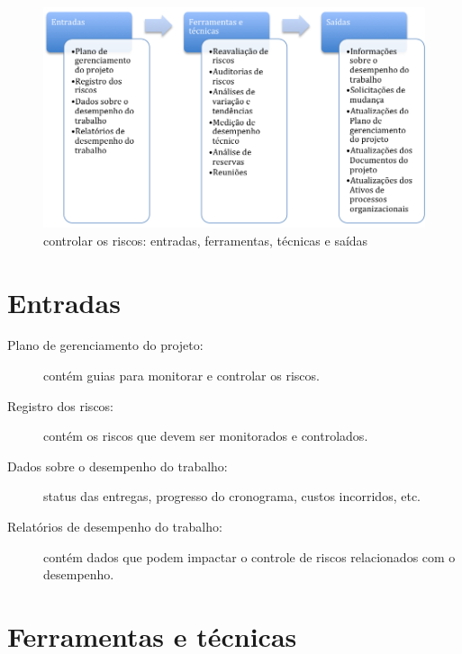 \begin{figure}[!h]
	\centering
	\includegraphics[scale=0.5]{Figuras/riscos_efts_controlar.png}
	\caption{controlar os riscos: entradas, ferramentas, técnicas e saídas}
	\label{fig:riscos:controlar:efts}
\end{figure}

\section{Entradas}

\begin{description}
	
	\item[Plano de gerenciamento do projeto:] contém guias para monitorar e controlar os riscos.
	
	\item[Registro dos riscos:] contém os riscos que devem ser monitorados e controlados.
	
	\item[Dados sobre o desempenho do trabalho:] status das entregas, progresso do cronograma, custos incorridos, etc.
	
	\item[Relatórios de desempenho do trabalho:] contém dados que podem impactar o controle de riscos relacionados com o desempenho.	
	
\end{description}

\section{Ferramentas e técnicas}

